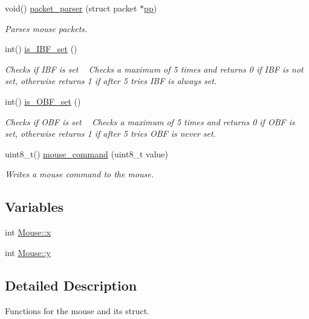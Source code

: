 \begin{DoxyCompactItemize}
void() \hyperlink{group__mouse_ga7a4689a8f91c2155ea5a1117721b86b9}{packet\+\_\+parser} (struct packet $\ast$\hyperlink{proj_8c_a26e83eca70c2b9169fbbb0eac7e32e32}{pp})
\begin{DoxyCompactList}\small\item\em Parses mouse packets. \end{DoxyCompactList}\item 
int() \hyperlink{group__mouse_gae5173853c368d50dd463f5c72a63ded9}{is\+\_\+\+I\+B\+F\+\_\+set} ()
\begin{DoxyCompactList}\small\item\em Checks if I\+BF is set ~\newline
 Checks a maximum of 5 times and returns 0 if I\+BF is not set, otherwise returns 1 if after 5 tries I\+BF is always set. \end{DoxyCompactList}\item 
int() \hyperlink{group__mouse_ga3a67eb6eb302f8140a3a6d16d40c86af}{is\+\_\+\+O\+B\+F\+\_\+set} ()
\begin{DoxyCompactList}\small\item\em Checks if O\+BF is set ~\newline
 Checks a maximum of 5 times and returns 0 if O\+BF is set, otherwise returns 1 if after 5 tries O\+BF is never set. \end{DoxyCompactList}\item 
uint8\+\_\+t() \hyperlink{group__mouse_gacbf0aed06c0dbd0869075d318adf3147}{mouse\+\_\+command} (uint8\+\_\+t value)
\begin{DoxyCompactList}\small\item\em Writes a mouse command to the mouse. \end{DoxyCompactList}\end{DoxyCompactItemize}
\subsection*{Variables}
\begin{DoxyCompactItemize}
\item 
int \hyperlink{group__mouse_ga136eea114b70f46392b89cc3779d4291}{Mouse\+::x}
\item 
int \hyperlink{group__mouse_ga4a29b1c18faaa2fbe39ff985ba9d6737}{Mouse\+::y}
\end{DoxyCompactItemize}


\subsection{Detailed Description}
Functions for the mouse and its struct.

